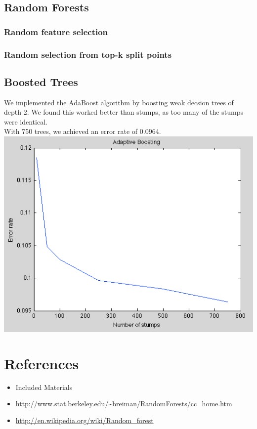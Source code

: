 \documentclass[11pt,a4paper]{article}
\begin{document}
\subsection{Random Forests}
\subsubsection{Random feature selection}

\subsubsection{Random selection from top-k split points}

\subsection{Boosted Trees}
We implemented the AdaBoost algorithm by boosting weak decsion trees of depth 2. We found this worked better than stumps, as too many of the stumps were identical. \\
With 750 trees, we achieved an error rate of 0.0964. \\
\includegraphics[width=\textwidth]{adaboost.png}


\section{References}
\begin{itemize}
\item Included Materials
\item \url{http://www.stat.berkeley.edu/~breiman/RandomForests/cc_home.htm}
\item \url{http://en.wikipedia.org/wiki/Random_forest}
\end{itemize}
\end{document}
